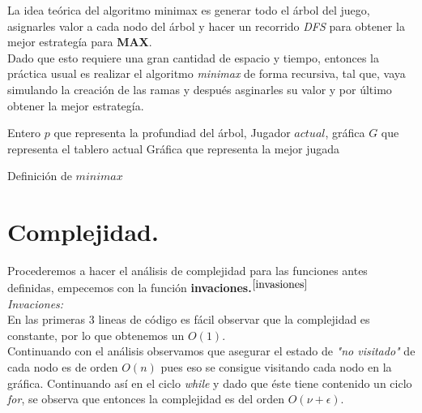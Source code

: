 \documentclass[12pt]{article}
\begin{document}
La idea te\'orica del algoritmo minimax es generar todo el \'arbol del juego, asignarles valor a cada
nodo del \'arbol y hacer un recorrido \textit{DFS} para obtener la mejor estrateg\'ia para \textbf{MAX}.\\

Dado que esto requiere una gran cantidad de espacio y tiempo, entonces la pr\'actica usual es realizar
el algoritmo \textit{minimax} de forma recursiva, tal que, vaya simulando la creaci\'on de las ramas y despu\'es
asginarles su valor y por \'ultimo obtener la mejor estrateg\'ia.\\
\newpage
\begin{algorithm}
\begin{algorithmic}[1]
\REQUIRE Entero $p$ que representa la profundiad del \'arbol, Jugador $actual$, gr\'afica $G$ que representa el tablero actual
\ENSURE  Gr\'afica que representa la mejor jugada
\ELSE
{}
\ENDIF
{}
\ELSE
{}
\ENDIF
{}
\ELSE
{}
\ENDIF
\ELSE
{}
\ENDIF
\ENDIF
\ENDFOR
\ENDIF
{}
\end{algorithmic}
\caption{Definici\'on de $minimax$}
\label{minimax}
\end{algorithm}



\section{Complejidad.}

Procederemos a hacer el an\'alisis de complejidad para las funciones antes definidas, empecemos con la funci\'on \textbf{invaciones.}$^{\ref{invasiones}}$\\
\textit{Invaciones:}\\
En las primeras 3 lineas de c\'odigo es f\'acil observar que la complejidad es constante, por lo que obtenemos un $O(1)$.\\
Continuando con el an\'alisis observamos que asegurar el estado de \textit{"no visitado"} de cada nodo es de orden $O(n)$ pues eso se consigue visitando cada nodo en la gr\'afica.
Continuando as\'i en el ciclo \textit{while} y dado que \'este tiene contenido un ciclo \textit{for}, se observa que entonces la 
complejidad es del orden $O (\nu + \epsilon)$.\\
\end{document}
